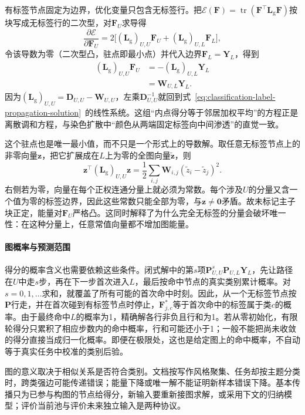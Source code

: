 有标签节点固定为边界，优化变量只包含无标签行。把$\mathcal E(\bm F)=\operatorname{tr}(\bm F^\top\bm L_{\mathrm g}\bm F)$按块写成无标签行的二次型，对$\bm F_U$求导得
\[
\frac{\partial\mathcal E}{\partial\bm F_U}
  =2\bigl[(\bm L_{\mathrm g})_{U,U}\bm F_U
        +(\bm L_{\mathrm g})_{U,L}\bm F_L\bigr],
\]
令该导数为零（二次型凸，驻点即最小点）并代入边界$\bm F_L=\bm Y_L$，得到
\begin{equation}
  \label{eq:classification-label-propagation-dirichlet}
  \begin{aligned}
    (\bm{L}_{\mathrm{g}})_{U,U}\bm{F}_U
      &=-(\bm{L}_{\mathrm{g}})_{U,L}\bm{Y}_L\\
      &=\bm{W}_{U,L}\bm{Y}_L.
  \end{aligned}
\end{equation}
因为$(\bm{L}_{\mathrm{g}})_{U,U}=\bm{D}_{U,U}-\bm{W}_{U,U}$，左乘$\bm{D}_{U,U}^{-1}$就回到式~\eqref{eq:classification-label-propagation-solution}~的线性系统。这组“内点得分等于邻居加权平均”的方程正是离散调和方程，与染色扩散中“颜色从两端固定标签向中间渗透”的直觉一致。

这个驻点也是唯一最小值，而不只是一个形式上的导数解。取任意无标签节点上的非零向量$\bm{z}$，把它扩展成在$L$上为零的全图向量$\widetilde{\bm{z}}$，则
\[
  \bm{z}^{\top}(\bm{L}_{\mathrm{g}})_{U,U}\bm{z}
    =\frac12\sum_{i,j}\bm{W}_{i,j}
      (\widetilde z_i-\widetilde z_j)^2.
\]
右侧若为零，向量在每个正权连通分量上就必须为常数。每个涉及$U$的分量又含一个值为零的标签边界，因此这些常数只能全部为零，与$\bm{z}\ne\bm{0}$矛盾。故未标记主子块正定，能量对$\bm{F}_U$严格凸。这同时解释了为什么完全无标签的分量会破坏唯一性：在这种分量上，任意常值向量都不增加图能量。

\paragraph{图概率与预测范围}
得分的概率含义也需要依赖这些条件。闭式解中的第$s$项$\bm P_{U,U}^{s}\bm P_{U,L}\bm Y_L$，先让路径在$U$中走$s$步，再在下一步首次进入$L$，最后按命中节点的真实类别累计概率。对$s=0,1,\ldots$求和，就覆盖了所有可能的首次命中时刻。因此，从一个无标签节点按$\bm{P}$行走，并在首次碰到有标签节点时停止，$\bm{F}_{j,c}^\ast$等于首次命中的标签属于类$c$的概率。由于最终命中$L$的概率为1，精确解各行非负且行和为1。若从零初始化，有限轮得分只累积了相应步数内的命中概率，行和可能还小于1；一般不能把尚未收敛的得分直接当成归一化概率。即便在极限处，这也是给定图上的命中概率，不自动等于真实任务中校准的类别后验。

图的意义取决于相似关系是否符合类别。文档按写作风格聚集、任务却按主题分类时，跨类强边可能传递错误；能量下降或唯一解不能证明新样本错误下降。基本传播只为已参与构图的节点给得分，新输入要重新接图求解，或采用下文的归纳模型；评价当前池与评价未来独立输入是两种协议。

